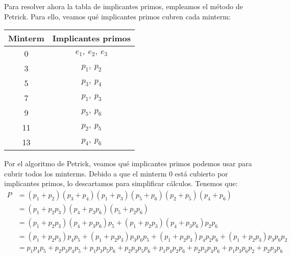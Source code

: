 \begin{ejercicio}
    Para resolver ahora la tabla de implicantes primos, empleamos el método de Petrick. Para ello, veamos qué implicantes primos cubren cada minterm:
    \begin{table}[H]
        \centering
        \begin{tabular}{c|c}
            Minterm & Implicantes primos \\ \hline
            0 & $e_1,~e_2,~e_3$ \\
            3 & $p_1,~p_2$ \\
            5 & $p_3,~p_4$ \\
            7 & $p_1,~p_3$ \\
            9 & $p_5,~p_6$ \\
            11 & $p_2,~p_5$ \\
            13 & $p_4,~p_6$
        \end{tabular}
    \end{table}

    Por el algoritmo de Petrick, veamos qué implicantes primos podemos usar para cubrir todos los minterms.
    Debido a que el minterm $0$ está cubierto por implicantes primos, lo descartamos para simplificar cálculos. Tenemos que:
    \begin{align*}
        P &= (p_1+p_2)(p_3+p_4)(p_1+p_3)(p_5+p_6)(p_2+p_5)(p_4+p_6)\\
        &= (p_1+p_2p_3)(p_4+p_3p_6)(p_5+p_2p_6) \\
        &= (p_1+p_2p_3)(p_4+p_3p_6)p_5 + (p_1+p_2p_3)(p_4+p_3p_6)p_2p_6\\
        &= (p_1+p_2p_3)p_4p_5 + (p_1+p_2p_3)p_3p_6p_5 + (p_1+p_2p_3)p_4p_2p_6 + (p_1+p_2p_3)p_3p_6p_2\\
        &= p_1p_4p_5 + p_2p_3p_4p_5 + p_1p_3p_5p_6 + p_2p_3p_5p_6 + p_1p_4p_2p_6 + p_2p_3p_4p_6 + p_1p_3p_6p_2 + p_2p_3p_6\\
    \end{align*}


\end{ejercicio}

